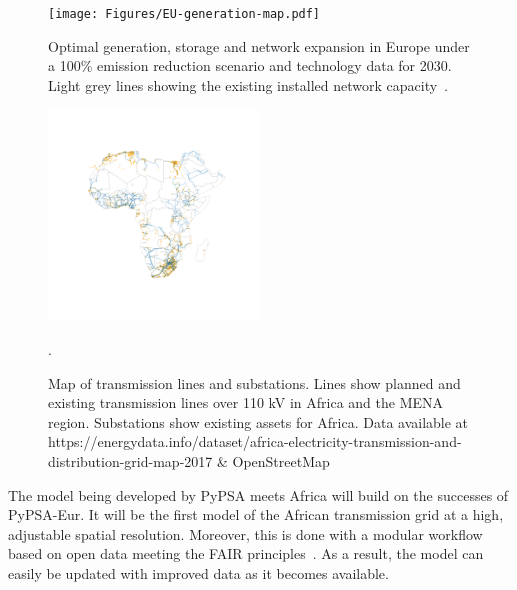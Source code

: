 \documentclass[conference, a4paper]{IEEEtran}
\begin{document}

\begin{figure}[htbp]
\centerline{\texttt{[image: Figures/EU-generation-map.pdf]}}
\caption{Optimal generation, storage and network expansion in Europe under a 100\% emission reduction scenario and technology data for 2030. Light grey lines showing the existing installed network capacity~\cite{parzen-neumann-ea-2021}.}
\label{EU-Map}
\end{figure}


\begin{figure}[htbp]
\centerline{\includegraphics[trim={4cm 8cm 4cm 8cm},clip,width = 0.5\textwidth]{Figures/africa_transmission_network_and_substations.png}}
\caption{Map of transmission lines and substations. Lines show planned and existing transmission lines over 110 kV in Africa and the MENA region. Substations show existing assets for Africa. Data available at https://energydata.info/dataset/africa-electricity-transmission-and-distribution-grid-map-2017 \& OpenStreetMap}.
\label{AfricaMApTransmission}
\end{figure}

The model being developed by PyPSA meets Africa will build on the successes of PyPSA-Eur.
It will be the first model of the African transmission grid at a high, adjustable spatial resolution.
Moreover, this is done with a modular workflow based on open data meeting the FAIR principles~\cite{wilkinson-dumontier-ea-2016}.
As a result, the model can easily be updated with improved data as it becomes available.
\end{document}
